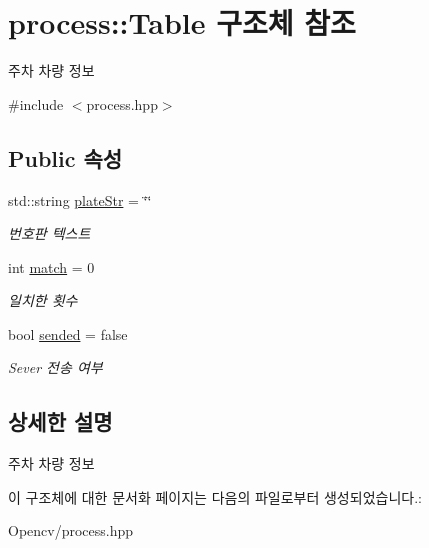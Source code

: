\hypertarget{structprocess_1_1_table}{}\section{process\+:\+:Table 구조체 참조}
\label{structprocess_1_1_table}


주차 차량 정보  




{\ttfamily \#include $<$process.\+hpp$>$}

\subsection*{Public 속성}
\begin{DoxyCompactItemize}
\item 
\mbox{\label{structprocess_1_1_table_a5cffcdbe502a6165eb806b64ba27fbe0}} 
std\+::string \hyperlink{structprocess_1_1_table_a5cffcdbe502a6165eb806b64ba27fbe0}{plate\+Str} = \char`\"{}\char`\"{}
\begin{DoxyCompactList}\small\item\em 번호판 텍스트 \end{DoxyCompactList}\item 
\mbox{\label{structprocess_1_1_table_a930e1f2f75a47d337ad2fab346791c19}} 
int \hyperlink{structprocess_1_1_table_a930e1f2f75a47d337ad2fab346791c19}{match} = 0
\begin{DoxyCompactList}\small\item\em 일치한 횟수 \end{DoxyCompactList}\item 
\mbox{\label{structprocess_1_1_table_aefdb336dc1532718fcbf1708a35d9aff}} 
bool \hyperlink{structprocess_1_1_table_aefdb336dc1532718fcbf1708a35d9aff}{sended} = false
\begin{DoxyCompactList}\small\item\em Sever 전송 여부 \end{DoxyCompactList}\end{DoxyCompactItemize}


\subsection{상세한 설명}
주차 차량 정보 

이 구조체에 대한 문서화 페이지는 다음의 파일로부터 생성되었습니다.\+:\begin{DoxyCompactItemize}
\item 
Opencv/process.\+hpp\end{DoxyCompactItemize}
